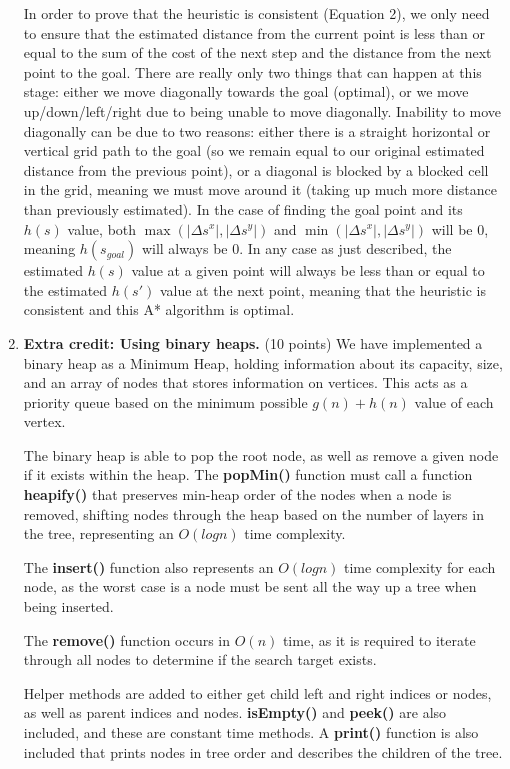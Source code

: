 \documentclass[12pt]{article}
\begin{document}
\begin{enumerate}[label=(\alph*)]
  In order to prove that the heuristic is consistent (Equation 2), we only need to ensure that the estimated distance from the current point is less than or equal to the sum of the cost of the next step and the distance from the next point to the goal. There are really only two things that can happen at this stage: either we move diagonally towards the goal (optimal), or we move up/down/left/right due to being unable to move diagonally. Inability to move diagonally can be due to two reasons: either there is a straight horizontal or vertical grid path to the goal (so we remain equal to our original estimated distance from the previous point), or a diagonal is blocked by a blocked cell in the grid, meaning we must move around it (taking up much more distance than previously estimated). In the case of finding the goal point and its $h(s)$ value, both $\max(|\Delta s^x|, |\Delta s^y|)$ and $\min(|\Delta s^x|, |\Delta s^y|)$ will be 0, meaning $h(s_{goal})$ will always be 0. In any case as just described, the estimated $h(s)$ value at a given point will always be less than or equal to the estimated $h(s')$ value at the next point, meaning that the heuristic is consistent and this A* algorithm is optimal.
  
  \item \textbf{Extra credit: Using binary heaps.} (10 points) We have implemented a binary heap as a Minimum Heap, holding information about its capacity, size, and an array of nodes that stores information on vertices. This acts as a priority queue based on the minimum possible $g(n) + h(n)$ value of each vertex.
  
  The binary heap is able to pop the root node, as well as remove a given node if it exists within the heap. The \textbf{popMin()} function must call a function \textbf{heapify()} that preserves min-heap order of the nodes when a node is removed, shifting nodes through the heap based on the number of layers in the tree, representing an $O(logn)$ time complexity. 
  
  The \textbf{insert()} function also represents an $O(logn)$ time complexity for each node, as the worst case is a node must be sent all the way up a tree when being inserted. 
  
  The \textbf{remove()} function occurs in $O(n)$ time, as it is required to iterate through all nodes to determine if the search target exists. 
  
  Helper methods are added to either get child left and right indices or nodes, as well as parent indices and nodes. \textbf{isEmpty()} and \textbf{peek()} are also included, and these are constant time methods. A \textbf{print()} function is also included that prints nodes in tree order and describes the children of the tree. 
  

\end{enumerate}
\end{document}

